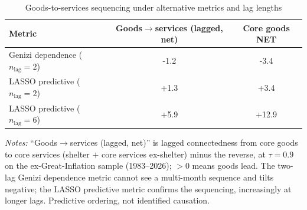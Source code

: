 \begin{table}[!ht]
\centering
\caption{Goods-to-services sequencing under alternative metrics and lag lengths}
\label{tab:h5}
\setlength{\tabcolsep}{6pt}\footnotesize
\begin{threeparttable}
\begin{tabular}{l c c}
\toprule
Metric & Goods$\to$services (lagged, net) & Core goods NET \\
\midrule
Genizi dependence ($n_{\text{lag}}{=}2$) & -1.2 & -3.4 \\
LASSO predictive ($n_{\text{lag}}{=}2$) & +1.3 & +3.4 \\
LASSO predictive ($n_{\text{lag}}{=}6$) & +5.9 & +12.9 \\
\bottomrule
\end{tabular}
\begin{tablenotes}[flushleft]\footnotesize
\item \textit{Notes:} ``Goods$\to$services (lagged, net)'' is lagged connectedness from core goods to core services (shelter $+$ core services ex-shelter) minus the reverse, at $\tau=0.9$ on the ex-Great-Inflation sample (1983--2026); $>0$ means goods lead. The two-lag Genizi dependence metric cannot see a multi-month sequence and tilts negative; the LASSO predictive metric confirms the sequencing, increasingly at longer lags. Predictive ordering, not identified causation.
\end{tablenotes}
\end{threeparttable}
\end{table}

